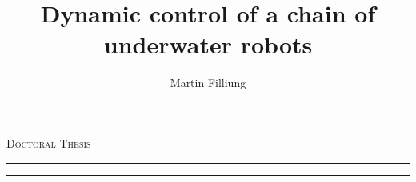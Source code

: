 \thispagestyle{title}

\title{Dynamic control of a chain of underwater robots}
\author{Martin Filliung}

\begin{center}

	\textsc{\LARGE Doctoral Thesis}
	\relax{}

	\rule{\textwidth}{1pt}
	\relax{}

	\textbf{\HUGE
		\thetitle{}
	}

	\relax{}

	\rule{\textwidth}{1pt}
	\relax{}

\end{center}

